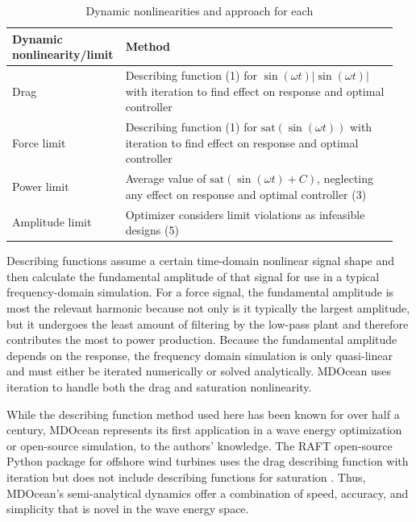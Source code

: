 \begin{table}
    \centering
    \begin{tabular}{>{\raggedright\arraybackslash}p{0.25\linewidth}>{\raggedright\arraybackslash}p{0.7\linewidth}}
         \textbf{Dynamic nonlinearity/limit}& \parbox{\linewidth}{\centering\textbf{Method}}\\ \hline
         Drag& Describing function (1) for $\sin(\omega t)|\sin(\omega t)|$ with iteration to find effect on response and optimal controller\\
         Force limit& Describing function (1) for $\text{sat}(\sin(\omega t))$ with iteration to find effect on response and optimal controller\\
         Power limit& Average value of $\text{sat}(\sin(\omega t)+C)$, neglecting any effect on response and optimal controller (3)\\
  Amplitude limit&Optimizer considers limit violations as infeasible designs (5)\\\end{tabular}
    \caption{Dynamic nonlinearities and approach for each}
    \label{tab:nonlinearities}
\end{table}

Describing functions assume a certain time-domain nonlinear signal shape and then calculate the fundamental amplitude of that signal for use in a typical frequency-domain simulation.
For a force signal, the fundamental amplitude is most the relevant harmonic because not only is it typically the largest amplitude, but it undergoes the least amount of filtering by the low-pass plant and therefore contributes the most to power production.
Because the fundamental amplitude depends on the response, the frequency domain simulation is only quasi-linear and must either be iterated numerically or solved analytically.
MDOcean uses iteration to handle both the drag and saturation nonlinearity. %

While the describing function method used here has been known for over half a century, MDOcean represents its first application in a wave energy optimization or open-source simulation, to the authors' knowledge.
The RAFT open-source Python package for offshore wind turbines uses the drag describing function with iteration but does not include describing functions for saturation \cite{hall_open-source_2022}.
Thus, MDOcean's semi-analytical dynamics offer a combination of speed, accuracy, and simplicity that is novel in the wave energy space.

